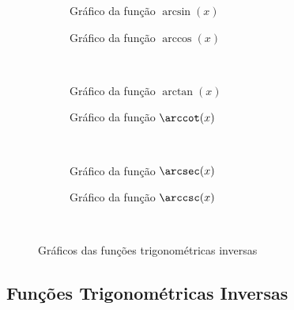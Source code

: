 \begin{figure}
  \centering
  \begin{subfigure}[b]{0.5\linewidth}
    \centering
    
    \caption{Gráfico da função $\arcsin(x)$}
    \label{fig:functions_asin}
  \end{subfigure}%
  \begin{subfigure}[b]{0.5\linewidth}
    \centering
    
    \caption{Gráfico da função $\arccos(x)$}
    \label{fig:functions_acos}
  \end{subfigure}\\[0.5\baselineskip]
  \begin{subfigure}[b]{0.5\linewidth}
    \centering
    
    \caption{Gráfico da função $\arctan(x)$}
    \label{fig:functions_atan}
  \end{subfigure}%
  \begin{subfigure}[b]{0.5\linewidth}
    \centering
    
    \caption{Gráfico da função $\arccot(x)$}
    \label{fig:functions_acot}
  \end{subfigure}\\[0.5\baselineskip]
  \begin{subfigure}[b]{0.5\linewidth}
    \centering
    
    \caption{Gráfico da função $\arcsec(x)$}
    \label{fig:functions_asec}
  \end{subfigure}%
  \begin{subfigure}[b]{0.5\linewidth}
    \centering
    
    \caption{Gráfico da função $\arccsc(x)$}
    \label{fig:functions_acsc}
  \end{subfigure}\\[0.5\baselineskip]
  \caption{Gráficos das funções trigonométricas inversas}
  \label{fig:functions_trig_inv}
\end{figure}

\subsection*{Funções Trigonométricas Inversas}

